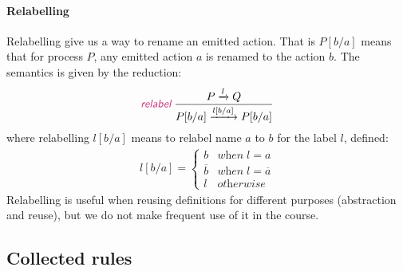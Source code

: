 \documentclass{article}
\theoremstyle{definition}
\newcommand{\trule}[1]{\textcolor{labelColor}{\textit{\textsf{#1}}}\;}
\begin{document}
\paragraph{Relabelling}

Relabelling give us a way to rename an emitted action.
That is $P [b/a]$ means that for process $P$, any emitted action $a$
is renamed to the action $b$. The semantics is given by
the reduction:
%
\begin{align*}
  \trule{relabel}
\dfrac{P \xrightarrow{l} Q}
  {P[b/a] \xrightarrow{l[b/a]} P[b/a]}
\end{align*}
%
where relabelling $l[b/a]$ means to relabel name $a$ to $b$ for the label $l$, defined:
%
\begin{align*}
l[b/a] = \begin{cases}
b & \textit{when} \;l = a \\
\overline{b} & \textit{when} \; l = \overline{a} \\
l & \textit{otherwise}
\end{cases}
\end{align*}
%
Relabelling is useful when reusing definitions for different purposes
(abstraction and reuse), but we do not make frequent use of it in the course.

\subsection{Collected rules}
\end{document}
